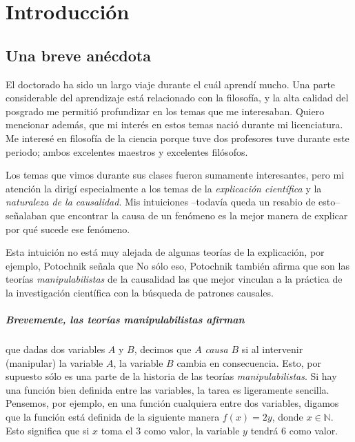 ﻿%

\chapter{Introducción}

\section{Una breve anécdota}

\noindent El doctorado ha sido un largo viaje durante el cuál aprendí mucho. 
Una parte considerable del aprendizaje está relacionado con la
filosofía, y la alta calidad del posgrado me permitió
profundizar en los temas que me interesaban. Quiero mencionar además, que
mi interés en estos temas nació durante mi licenciatura. Me interesé en
filosofía de la ciencia porque tuve dos profesores tuve durante este
periodo; ambos excelentes maestros y excelentes filósofos.

Los temas que vimos durante sus clases fueron sumamente interesantes, pero mi atención la dirigí especialmente a los temas de la \emph{explicación científica} y la \emph{naturaleza de la causalidad}. 
Mis intuiciones --todavía queda un resabio de esto-- señalaban que encontrar la causa de un fenómeno es la mejor manera de explicar por qué sucede ese fenómeno.

Esta intuición no está muy alejada de algunas teorías de la
explicación, por ejemplo, Potochnik señala que  \parencite[][p.~24]{Potochnik2017-POTIAT-3} 
No sólo eso, Potochnik también afirma que son las teorías \emph{manipulabilistas} \parencite{sep-causation-mani} de la causalidad las que mejor vinculan a la práctica de la investigación científica con la búsqueda de patrones causales. 

\paragraph{Brevemente, las teorías \emph{manipulabilistas} afirman} que dadas dos variables $A$ y $B$, decimos que $A$ \emph{causa} $B$ si al intervenir (manipular) la variable $A$, la variable $B$ cambia en consecuencia.
Esto, por supuesto sólo es una parte de la historia de las teorías \emph{manipulabilistas}. 
Si hay una función bien definida entre las variables, la tarea es ligeramente sencilla.
Pensemos, por ejemplo, en una función cualquiera entre dos variables, digamos que la función está definida de la siguiente manera $f(x) = 2y$, donde $x \in \mathbb{N}$.
Esto significa que si $x$ toma el $3$ como valor, la variable $y$ tendrá $6$ como valor.

